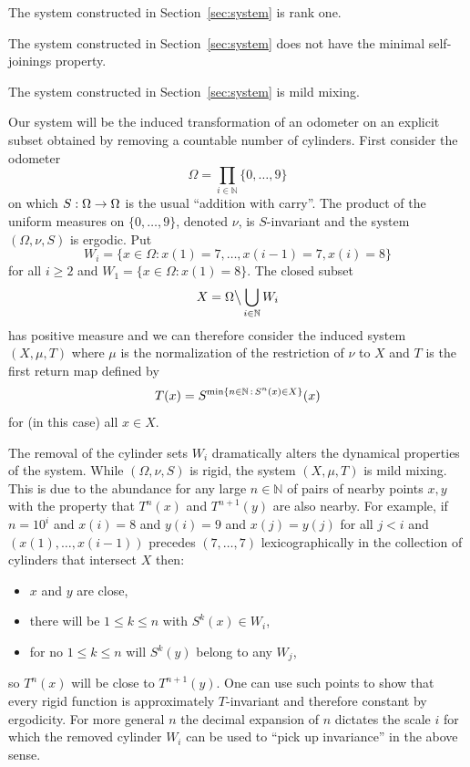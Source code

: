 \documentclass[AHL,Unicode,longabstracts,published]{cedram}
\newcommand{\N}{\mathbb{N}}
\let\originalleft\left
\let\originalright\right
\renewcommand{\left}{\mathopen{}\mathclose\bgroup\originalleft}
\renewcommand{\right}{\aftergroup\egroup\originalright}
\renewcommand*{\to}{\mathchoice{\longrightarrow}{\rightarrow}{\rightarrow}{\rightarrow}}
\begin{document}
\begin{theo}\label{thm:rank one}
The system constructed in Section~\ref{sec:system} is rank one.
\end{theo}

\begin{theo}\label{thm:ergodic joining}
The system constructed in Section~\ref{sec:system} does not have the minimal self-joinings property.
\end{theo}

\begin{theo}\label{thm:mild mixing}
The system constructed in Section~\ref{sec:system} is mild mixing.
\end{theo}

Our system will be the induced transformation of an odometer on an explicit subset obtained by removing a countable number of cylinders. First consider the odometer
\[
\Omega = \prod_{i \in \N} \{0, \dots, 9 \}
\]
on which $S : \Omega \to \Omega$ is the usual ``addition with carry''. The product of the uniform measures on $\{0,\dots,9\}$, denoted $\nu$, is $S$-invariant and the system $(\Omega, \nu, S)$ is ergodic. Put
\[
W_i = \{ x \in \Omega : x(1) = 7,\dots, x(i-1) = 7, x(i) = 8 \}
\]
for all $i \ge 2$ and $W_1 = \{ x \in \Omega : x(1) = 8 \}$. The closed subset
\[
X = \Omega \big\backslash \bigcup_{i \in \N} W_i
\]
has positive measure and we can therefore consider the induced system $(X,\mu,T)$ where $\mu$ is the normalization of the restriction of $\nu$ to $X$ and $T$ is the first return map defined by
\[
T(x) = S^{\min \left\{ n \in \N\, :\, S^n(x) \in X\right\}}(x)
\]
for (in this case) all $x \in X$.

The removal of the cylinder sets $W_i$ dramatically alters the dynamical properties of the system. While $(\Omega,\nu,S)$ is rigid, the system $(X,\mu,T)$ is mild mixing. This is due to the abundance for any large $n \in \N$ of pairs of nearby points $x,y$ with the property that $T^n(x)$ and $T^{n+1}(y)$ are also nearby. For example, if $n = 10^i$ and $x(i) = 8$ and $y(i) = 9$ and $x(j) = y(j)$ for all $j < i$ and $(x(1),\dots,x(i-1))$ precedes $(7,\dots,7)$ lexicographically in the collection of cylinders that intersect $X$ then:
\begin{itemize}
\item $x$ and $y$ are close,
\item there will be $1 \le k \le n$ with $S^k(x) \in W_i$,
\item for no $1 \le k \le n$ will $S^k(y)$ belong to any $W_j$,
\end{itemize}
so $T^n(x)$ will be close to $T^{n+1}(y)$. One can use such points to show that every rigid function is approximately $T$-invariant and therefore constant by ergodicity. For more general $n$ the decimal expansion of $n$ dictates the scale $i$ for which the removed cylinder $W_i$ can be used to ``pick up invariance'' in the above sense.
\end{document}
